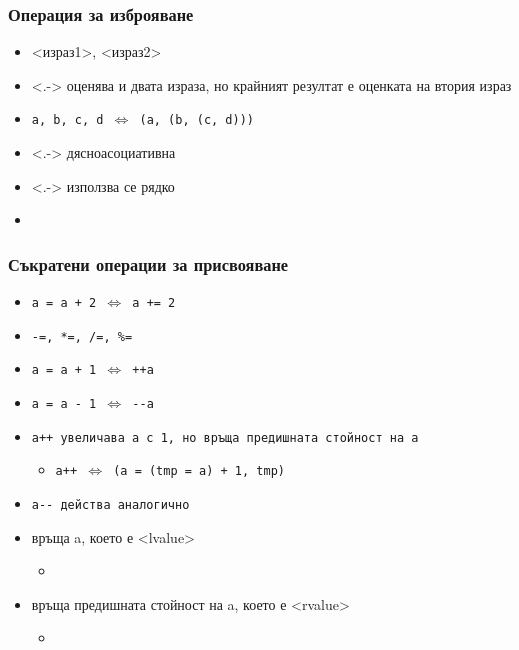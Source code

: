\documentclass{beamer}
\begin{document}
\begin{frame}
  \frametitle{Операция за изброяване}

  \begin{itemize}[<+->]
  \item{} <израз1>\tta, <израз2>
  \item<.-> оценява и двата израза, но крайният резултат е оценката на втория израз
  \item \tt{a, b, c, d} $\Leftrightarrow$ \tt{(a, (b, (c, d)))}
  \item<.-> \alert{дясноасоциативна}
  \item<.-> използва се рядко
  \item \exa {}
  \end{itemize}
\end{frame}

\begin{frame}
  \frametitle{Съкратени операции за присвояване}

  \begin{itemize}[<+->]
  \item \tt{a = a + 2} $\Leftrightarrow$ \tt{a += 2}
  \item \tt{-=}, \tt{*=}, \tt{/=}, \tt{\%=}
  \item \tt{a = a + 1}  $\Leftrightarrow$ \tt{++a}
  \item \tt{a = a - 1}  $\Leftrightarrow$ \tt{-{}-a}
  \item \tt{a++} увеличава a с 1, но връща предишната стойност на \tt a
    \begin{itemize}
    \item \tt{a++} $\Leftrightarrow$ \tt{(a = (tmp = a) + 1, tmp)}
    \end{itemize}
  \item \tt{a-{}-} действа аналогично
  \item {} връща a, което е \alert{<lvalue>}
    \begin{itemize}
    \item \exa {}
    \end{itemize}
  \item {} връща предишната стойност на a, което е \alert{<rvalue>}
    \begin{itemize}
    \item \exa {} 
    \end{itemize}
  \end{itemize}
\end{frame}
\end{document}
